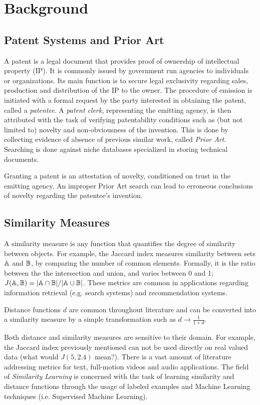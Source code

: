 \documentclass[conference]{IEEEtran}
\begin{document}
\section{Background}
\subsection{Patent Systems and Prior Art}
A patent is a legal document that provides proof of ownership of intellectual property (IP). It is commonly issued by government run agencies to individuals or organizations. Its main function is to secure legal exclusivity regarding sales, production and distribution of the IP to the owner. The procedure of emission is initiated with a formal request by the party interested in obtaining the patent, called a \emph{patentee}. A \emph{patent clerk}, representing the emitting agency, is then attributed with the task of verifying patentability conditions such as (but not limited to) novelty and non-obviousness of the invention. This is done by collecting evidence of absence of previous similar work, called \emph{Prior Art}. Searching is done against niche databases specialized in storing technical documents.

Granting a patent is an attestation of novelty, conditioned on trust in the emitting agency. An improper Prior Art search can lead to erroneous conclusions of novelty regarding the patentee's invention. 

\subsection{Similarity Measures}
A similarity measure is any function that quantifies the degree of similarity between objects. For example, the Jaccard index measures similarity between sets ${\mathbb{A}}$ and ${\mathbb{B}}$, by comparing the number of common elements. Formally, it is the ratio between the the intersection and union, and varies between 0 and 1; $J({\mathbb{A}}, {\mathbb{B}}) = \vert{\mathbb{A}}\cap{\mathbb{B}}\vert/\vert{\mathbb{A}}\cup{\mathbb{B}}\vert$. These metrics are common in applications regarding information retrieval (e.g. search systems) and recommendation systems.

Distance functions $d$ are common throughout literature and can be converted into a similarity measure by a simple transformation such as $d \to \frac{1}{1+d}$.

Both distance and similarity measures are sensitive to their domain. For example, the Jaccard index previously mentioned can not be used directly on real valued data (what would $J(5, 2.4)$ mean?). There is a vast amount of literature addressing metrics for text, full-motion videos and audio applications. The field of \emph{Similarity Learning} is concerned with the task of learning similarity and distance functions through the usage of labeled examples and Machine Learning techniques (i.e. Supervised Machine Learning).
 
\end{document}
